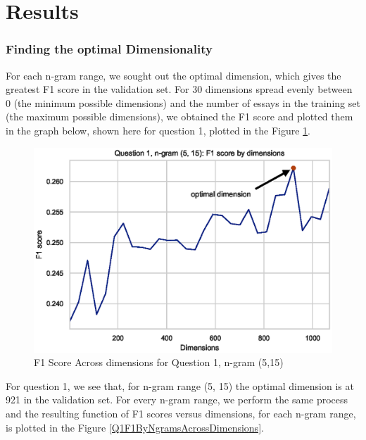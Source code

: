 \documentclass[10pt,letterpaper]{article}
\begin{document}
\section{Results}

\subsubsection{Finding the optimal Dimensionality}

For each n-gram range, we sought out the optimal dimension, which gives the greatest F1 score in the validation set. For 30 dimensions spread evenly between 0 (the minimum possible dimensions) and the number of essays in the training set (the maximum possible dimensions), we obtained the F1 score and plotted them in the graph below, shown here for question 1, plotted in the Figure \ref{Q1Ngram5to15}.

\begin{figure}[ht]
\begin{center}
\includegraphics[width=\linewidth]{img/Q1Ngram5to15.eps}
\end{center}
\caption{F1 Score Across dimensions for Question 1, n-gram (5,15)}
\label{Q1Ngram5to15}
\end{figure}

For question 1, we see that, for n-gram range (5, 15) the optimal dimension is at 921 in the validation set. For every n-gram range, we perform the same process and the resulting function of F1 scores versus dimensions, for each n-gram range, is plotted in the Figure \ref{Q1F1ByNgramsAcrossDimensions}.
\end{document}
